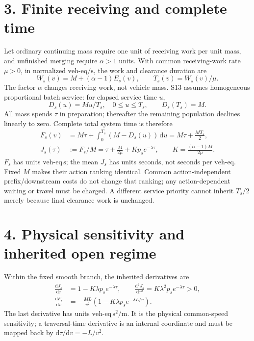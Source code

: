 \documentclass[11pt]{article}
\newcommand{\ve}{\mathrm{veh\mbox{-}eq}}
\newcommand{\dd}{\mathrm{d}}
\begin{document}
\newpage
\section*{3. Finite receiving and complete time}
Let ordinary continuing mass require one unit of receiving work per unit mass,
and unfinished merging require $\alpha>1$ units. With common receiving-work
rate $\mu>0$, in normalized $\ve/\mathrm{s}$, the work and clearance duration are
\begin{equation}
 W_s(v)=M+(\alpha-1)E_s(v),\qquad T_s(v)=W_s(v)/\mu.
 \label{eq:work}
\end{equation}
The factor $\alpha$ changes receiving work, not vehicle mass. S13 assumes
homogeneous proportional batch service: for elapsed service time $u$,
\begin{equation}
 D_s(u)=M u/T_s,\quad 0\le u\le T_s,\qquad D_s(T_s)=M.
 \label{eq:departures}
\end{equation}
All mass spends $\tau$ in preparation; thereafter the remaining population
declines linearly to zero. Complete total system time is therefore
\begin{align}
 F_s(v)&=M\tau+\int_0^{T_s}(M-D_s(u))\,\dd u
       =M\tau+\frac{M T_s}{2}, \label{eq:total}\\
 J_s(\tau)&:=F_s/M
       =\tau+\frac{M}{2\mu}+Kp_s e^{-\lambda\tau},
       \qquad K=\frac{(\alpha-1)M}{2\mu}. \label{eq:mean}
\end{align}
$F_s$ has units $\ve\,\mathrm{s}$; the mean $J_s$ has units seconds,
not seconds per $\ve$. Fixed $M$ makes their action ranking identical.
Common action-independent prefix/downstream costs do not change that ranking;
any action-dependent waiting or travel must be charged. A different service
priority cannot inherit $T_s/2$ merely because final clearance work is unchanged.

\section*{4. Physical sensitivity and inherited open regime}
Within the fixed smooth branch, the inherited derivatives are
\begin{align}
 \frac{\dd J_s}{\dd\tau}&=1-K\lambda p_s e^{-\lambda\tau},\qquad
 \frac{\dd^2J_s}{\dd\tau^2}=K\lambda^2p_s e^{-\lambda\tau}>0,\label{eq:taugrad}\\
 \frac{\dd F_s}{\dd v}&=-\frac{ML}{v^2}
       \left(1-K\lambda p_s e^{-\lambda L/v}\right).
 \label{eq:speedgrad}
\end{align}
The last derivative has units $\ve\,\mathrm{s}^2/\mathrm{m}$. It is the
physical common-speed sensitivity; a traversal-time derivative is an internal
coordinate and must be mapped back by $\dd\tau/\dd v=-L/v^2$.
\end{document}
